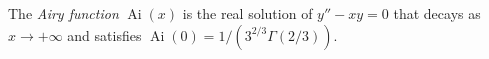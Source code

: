 
The \emph{Airy function} $\operatorname{Ai}(x)$ is the real solution of $y''-xy=0$ that decays as $x\to+\infty$ and satisfies $\operatorname{Ai}(0)=1/(3^{2/3}\Gamma(2/3))$.
